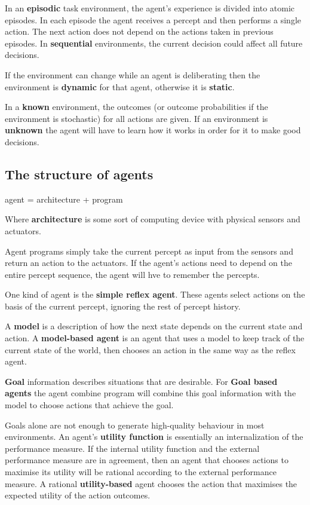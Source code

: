 \documentclass{article}
\begin{document}
In an \textbf{episodic} task environment, the agent's experience is divided into atomic episodes. In each episode the agent receives a percept and then performs a single action. The next action does not depend on the actions taken in previous episodes. In \textbf{sequential} environments, the current decision could affect all future decisions. \newline 

If the environment can change while an agent is deliberating then the environment is \textbf{dynamic} for that agent, otherwise it is \textbf{static}. \newline

In a \textbf{known} environment, the outcomes (or outcome probabilities if the environment is stochastic) for all actions are given. If an environment is \textbf{unknown} the agent will have to learn how it works in order for it to make good decisions.

\subsection{The structure of agents}

agent = architecture + program

Where \textbf{architecture} is some sort of computing device with physical sensors and actuators.

Agent programs simply take the current percept as input from the sensors and return an action to the actuators. If the agent's actions need to depend on the entire percept sequence, the agent will hve to remember the percepts.

One kind of agent is the \textbf{simple reflex agent}. These agents select actions on the basis of the current percept, ignoring the rest of percept history. \

A \textbf{model} is a description of how the next state depends on the current state and action. A \textbf{model-based agent} is an agent that uses a model to keep track of the current state of the world, then chooses an action in the same way as the reflex agent. \newline

\textbf{Goal} information describes situations that are desirable. For \textbf{Goal based agents} the agent combine program will combine this goal information with the model to choose actions that achieve the goal. \newline

Goals alone are not enough to generate high-quality behaviour in most environments. An agent's \textbf{utility function} is essentially an internalization of the performance measure. If the internal utility function and the external performance measure are in agreement, then an agent that chooses actions to maximise its utility will be rational according to the external performance measure. A rational \textbf{utility-based} agent chooses the action that maximises the expected utility of the action outcomes. \newline
\end{document}
